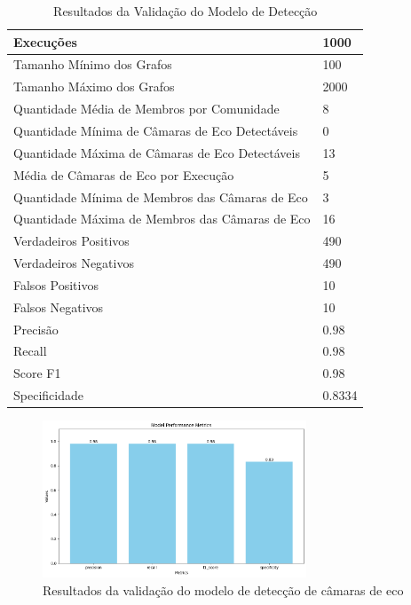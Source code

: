 \begin{table}[!ht]
	\centering
	\caption{Resultados da Validação do Modelo de Detecção}
	\begin{tabular}{|l|l|}
		\hline
		Execuções                                       & 1000   \\ \hline
		Tamanho Mínimo dos Grafos                       & 100    \\ \hline
		Tamanho Máximo dos Grafos                       & 2000   \\ \hline
		Quantidade Média de Membros por Comunidade      & 8      \\ \hline
		Quantidade Mínima de Câmaras de Eco Detectáveis & 0      \\ \hline
		Quantidade Máxima de Câmaras de Eco Detectáveis & 13     \\ \hline
		Média de Câmaras de Eco por Execução            & 5      \\ \hline
		Quantidade Mínima de Membros das Câmaras de Eco & 3      \\ \hline
		Quantidade Máxima de Membros das Câmaras de Eco & 16     \\ \hline
		Verdadeiros Positivos                           & 490    \\ \hline
		Verdadeiros Negativos                           & 490    \\ \hline
		Falsos Positivos                                & 10     \\ \hline
		Falsos Negativos                                & 10     \\ \hline
		Precisão                                        & 0.98   \\ \hline
		Recall                                          & 0.98   \\ \hline
		Score F1                                        & 0.98   \\ \hline
		Specificidade                                   & 0.8334 \\ \hline
	\end{tabular}
\end{table}

\begin{figure}[htb]
	\centering
	\includegraphics[width=0.7\textwidth]{images/echo_chamber_model_validation.png}
	\caption{Resultados da validação do modelo de detecção de câmaras de eco}
	\label{fig:echo_chamber_model_validation}
\end{figure}

